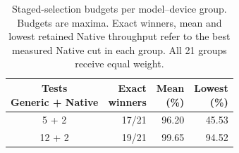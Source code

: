 \begin{table}[t]
\centering\small
\caption{Staged-selection budgets per model--device group. Budgets are maxima. Exact winners, mean and lowest retained Native throughput refer to the best measured Native cut in each group. All 21 groups receive equal weight.}
\label{tab:staged-budget}
\setlength{\tabcolsep}{3pt}
\begin{tabular*}{\columnwidth}{@{\extracolsep{\fill}}crrr@{}}
\toprule
\shortstack{Tests\\Generic + Native} & \shortstack{Exact\\winners} & \shortstack{Mean\\(\%)} & \shortstack{Lowest\\(\%)} \\
\midrule
5 + 2 & 17/21 & 96.20 & 45.53 \\
12 + 2 & 19/21 & 99.65 & 94.52 \\
\bottomrule
\end{tabular*}
\end{table}
